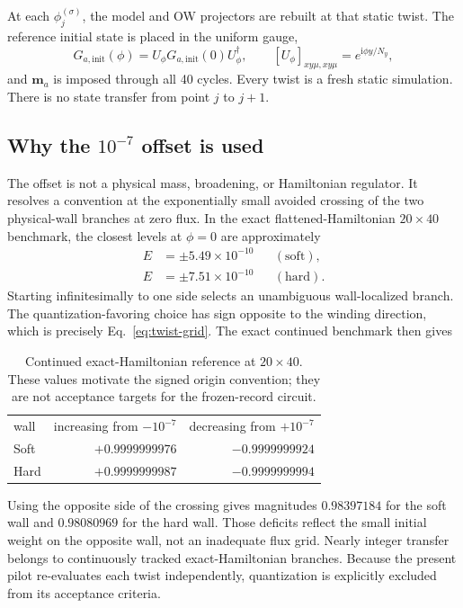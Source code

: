\documentclass[aps,prb,twocolumn,floatfix,nofootinbib,superscriptaddress]{revtex4-2}
\newcommand{\ii}{\mathrm{i}}
\begin{document}
At each $\phi_j^{(\sigma)}$, the model and OW projectors are rebuilt at that
static twist.  The reference initial state is placed in the uniform gauge,
\begin{equation}
  G_{a,\mathrm{init}}(\phi)
  =U_\phi G_{a,\mathrm{init}}(0)U_\phi^\dagger,
  \qquad
  [U_\phi]_{xy\mu,xy\mu}
  =e^{\ii\phi y/N_y},
  \label{eq:gauge-init}
\end{equation}
and $\boldsymbol m_a$ is imposed through all 40 cycles.  Every twist is a
fresh static simulation.  There is no state transfer from point $j$ to
$j+1$.

\subsection{Why the \texorpdfstring{$10^{-7}$}{1e-7} offset is used}

The offset is not a physical mass, broadening, or Hamiltonian regulator.  It
resolves a convention at the exponentially small avoided crossing of the two
physical-wall branches at zero flux.  In the exact flattened-Hamiltonian
$20\times40$ benchmark, the closest levels at $\phi=0$ are approximately
\begin{align}
  E&=\pm5.49\times10^{-10} &&(\text{soft}),\\
  E&=\pm7.51\times10^{-10} &&(\text{hard}).
\end{align}
Starting infinitesimally to one side selects an unambiguous wall-localized
branch.  The quantization-favoring choice has sign opposite to the winding
direction, which is precisely Eq.~\eqref{eq:twist-grid}.  The exact continued
benchmark then gives

\begin{table}[b]
\caption{Continued exact-Hamiltonian reference at $20\times40$.  These values
motivate the signed origin convention; they are not acceptance targets for
the frozen-record circuit.}
\label{tab:exact}
\begin{ruledtabular}
\begin{tabular}{lrr}
wall & increasing from $-10^{-7}$ & decreasing from $+10^{-7}$ \\
\colrule
Soft & $+0.9999999976$ & $-0.9999999924$ \\
Hard & $+0.9999999987$ & $-0.9999999994$ \\
\end{tabular}
\end{ruledtabular}
\end{table}

Using the opposite side of the crossing gives magnitudes $0.98397184$ for the
soft wall and $0.98080969$ for the hard wall.  Those deficits reflect the
small initial weight on the opposite wall, not an inadequate flux grid.
Nearly integer transfer belongs to continuously tracked exact-Hamiltonian
branches.  Because the present pilot re-evaluates each twist independently,
quantization is explicitly excluded from its acceptance criteria.
\end{document}
